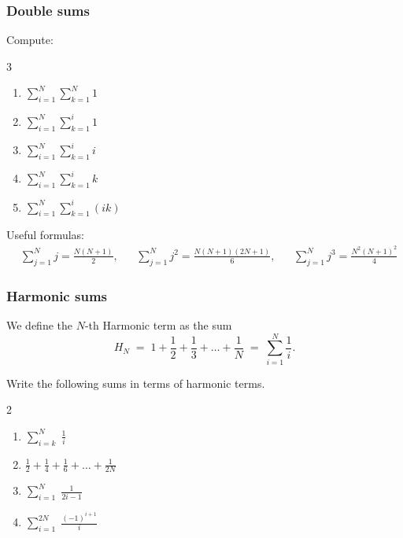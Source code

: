 \documentclass[14pt]{beamer}
\begin{document}
\begin{frame}[t]
	\frametitle{Double sums}

	Compute:
	\begin{multicols}{3}
		\begin{enumerate}
			\item $\displaystyle \sum_{i=1}^{N}\sum_{k=1}^{N}1$

			\item $\displaystyle \sum_{i=1}^{N}\sum_{k=1}^{i}1$

			\item $\displaystyle \sum_{i=1}^{N}\sum_{k=1}^{i}i$

			\item $\displaystyle \sum_{i=1}^{N}\sum_{k=1}^{i}k$

			\item $\displaystyle \sum_{i=1}^{N}\sum_{k=1}^{i}(ik)$
		\end{enumerate}
	\end{multicols}

	\vfill

	{\fontsize{10}{10}\selectfont Useful formulas: \begin{align*}&\sum_{j=1}^{N}j = \frac{N(N+1)}{2},&&\sum_{j=1}^{N}j^{2}= \frac{N(N+1)(2N+1)}{6},&&\sum_{j=1}^{N}j^{3}= \frac{N^{2}(N+1)^{2}}{4}\end{align*} }
\end{frame}

\begin{frame}[t]
	\fontsize{13}{13}\selectfont
	\frametitle{Harmonic sums}

	We define the $N$-th Harmonic term as the sum
	\[
		H_{N}\; = \; 1 + \frac{1}{2}+ \frac{1}{3}+ \ldots + \frac{1}{N}\; = \; \sum_{i=1}
		^{N}\frac{1}{i}.
	\]

	Write the following sums in terms of harmonic terms.

	\begin{multicols}{2}
		\begin{enumerate}
			\item $\displaystyle \sum_{i=k}^{N}\; \frac{1}{i}$

			\item $\displaystyle \frac{1}{2}+ \frac{1}{4}+ \frac{1}{6}+ \ldots + \frac{1}{2N}$

			\item $\displaystyle \sum_{i=1}^{N}\; \frac{1}{2i-1}$

			\item $\displaystyle \sum_{i=1}^{2N}\; \frac{(-1)^{i+1}}{i}$
		\end{enumerate}
	\end{multicols}
\end{frame}
\end{document}
